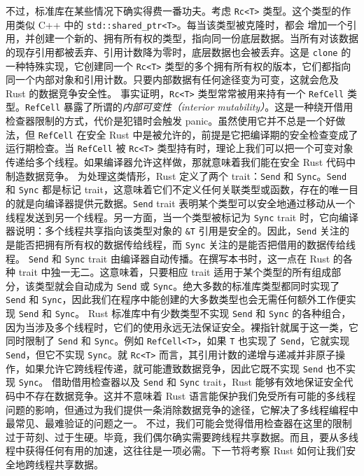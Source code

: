 不过，标准库在某些情况下确实得费一番功夫。考虑
\texttt{Rc<T>} 类型。这个类型的作用类似 C++ 中的 \texttt{std::\allowbreak{}shared\_\allowbreak{}ptr<\allowbreak{}T>\allowbreak{}}。每当该类型被克隆时，都会
增加一个引用，并创建一个新的、拥有所有权的类型，指向同一份底层数据。当所有对该数据的现存引用都被丢弃、引用计数降为零时，底层数据也会被丢弃。这是 \texttt{clone} 的一种特殊实现，它创建同一个 \texttt{Rc<T>} 类型的多个拥有所有权的版本，它们都指向同一个内部对象和引用计数。只要内部数据有任何途径变为可变，这就会危及 Rust 的数据竞争安全性。
\label{idx:idx_4b23ff69}
事实证明，\texttt{Rc<T>} 类型常常被用来持有一个 \texttt{RefCell} 类型。\texttt{RefCell} 暴露了所谓的\emph{内部可变性（interior mutability）}。这是一种绕开借用检查器限制的方式，代价是犯错时会触发 panic。虽然使用它并不总是一个好做法，但 \texttt{RefCell} 在安全 Rust 中是被允许的，前提是它把编译期的安全检查变成了运行期检查。当 \texttt{RefCell} 被 \texttt{Rc<T>} 类型持有时，理论上我们可以把一个可变对象传递给多个线程。如果编译器允许这样做，那就意味着我们能在安全 Rust 代码中制造数据竞争。
\label{idx:idx_a7681376}
\label{idx:idx_3e1cb47a}
\label{idx:idx_b621c382}
\label{idx:idx_59ed7011}
为处理这类情形，Rust 定义了两个 trait：\texttt{Send} 和 \texttt{Sync}。\texttt{Send} 和 \texttt{Sync} 都是标记 trait，这意味着它们不定义任何关联类型或函数，存在的唯一目的就是向编译器提供元数据。\texttt{Send} trait 表明某个类型可以安全地通过移动从一个线程发送到另一个线程。另一方面，当一个类型被标记为 \texttt{Sync} trait 时，它向编译器说明：多个线程共享指向该类型对象的 \texttt{\&T} 引用是安全的。因此，\texttt{Send} 关注的是能否把拥有所有权的数据传给线程，而 \texttt{Sync} 关注的是能否把借用的数据传给线程。
\texttt{Send} 和 \texttt{Sync} trait 由编译器自动传播。在撰写本书时，这一点在 Rust 的各种 trait 中独一无二。这意味着，只要相应 trait 适用于某个类型的所有组成部分，该类型就会自动成为 \texttt{Send} 或 \texttt{Sync}。绝大多数的标准库类型都同时实现了 \texttt{Send} 和 \texttt{Sync}，因此我们在程序中能创建的大多数类型也会无需任何额外工作便实现 \texttt{Send} 和 \texttt{Sync}。
\label{idx:idx_3056688e}
\label{idx:idx_52c76222}
Rust 标准库中有少数类型不实现 \texttt{Send} 和 \texttt{Sync} 的各种组合，因为当涉及多个线程时，它们的使用永远无法保证安全。裸指针就属于这一类，它同时限制了 \texttt{Send} 和 \texttt{Sync}。例如 \texttt{RefCell<T>}，如果 \texttt{T} 也实现了 \texttt{Send}，它就实现 \texttt{Send}，但它不实现 \texttt{Sync}。就 \texttt{Rc<T>} 而言，其引用计数的递增与递减并非原子操作，如果允许它跨线程传递，就可能遭致数据竞争，因此它既不实现 \texttt{Send} 也不实现 \texttt{Sync}。
\label{idx:idx_f3cc6215}
\label{idx:idx_b0ea0134}
借助借用检查器以及 \texttt{Send} 和 \texttt{Sync} trait，Rust 能够有效地保证安全代码中不存在数据竞争。这并不意味着 Rust 语言能保护我们免受所有可能的多线程问题的影响，但通过为我们提供一条消除数据竞争的途径，它解决了多线程编程中最常见、最难验证的问题之一。
不过，我们可能会觉得借用检查器在这里的限制过于苛刻、过于生硬。毕竟，我们偶尔确实需要跨线程共享数据。而且，要从多线程中获得任何有用的加速，这往往是一项必需。下一节将考察 Rust 如何让我们安全地跨线程共享数据。
